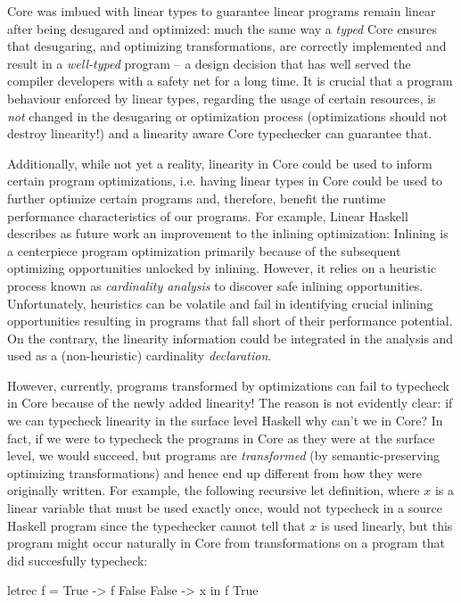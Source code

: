 \documentclass[]{lwnovathesis}
\begin{document}
Core was imbued with linear types to guarantee linear programs remain linear after being
desugared and optimized: much the same way a \emph{typed} Core ensures that
desugaring, and optimizing transformations, are correctly implemented and result
in a \emph{well-typed} program -- a design decision that has well served the
compiler developers with a safety net for a long time. It is crucial that a
program behaviour enforced by linear types, regarding the usage of certain
resources, is \emph{not} changed in the desugaring or optimization process
(optimizations should not destroy linearity!) and a linearity aware Core
typechecker can guarantee that.


Additionally, while not yet a reality, linearity in Core could be used to inform
certain program optimizations, i.e. having linear types in Core could be used to
further optimize certain programs and, therefore, benefit the runtime
performance characteristics of our programs. For example, Linear Haskell\cite{}
describes as future work an improvement to the inlining optimization: Inlining
is a centerpiece program optimization primarily because of the subsequent
optimizing opportunities unlocked by inlining. However, it relies on a heuristic
process known as \emph{cardinality analysis} to discover safe inlining
opportunities. Unfortunately, heuristics can be volatile and fail in identifying
crucial inlining opportunities resulting in programs that fall short of their
performance potential. On the contrary, the linearity information could be
integrated in the analysis and used as a (non-heuristic) cardinality
\emph{declaration}.

However, currently, programs transformed by optimizations can fail to typecheck
in Core because of the newly added linearity! The reason is not evidently clear:
if we can typecheck linearity in the surface level Haskell why can't we in Core?
In fact, if we were to typecheck the programs in Core as they were at the
surface level, we would succeed, but programs are \emph{transformed} (by
semantic-preserving optimizing transformations) and hence end up different from
how they were originally written. For example, the following recursive let
definition, where $x$ is a linear variable that must be used exactly once, would
not typecheck in a source Haskell program since the typechecker cannot tell that
$x$ is used linearly, but this program might occur naturally in Core from
transformations on a program that did succesfully typecheck:
\begin{code}
letrec f = \case
        True -> f False
        False -> x
in f True
\end{code}
\end{document}
